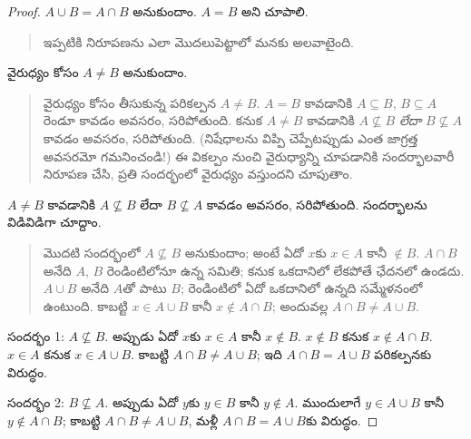 \documentclass[../../../include/open-logic-section]{subfiles}
\begin{document}
\begin{proof}
  $A \cup B = A \cap B$ అనుకుందాం. $A = B$ అని చూపాలి.
  \begin{quote}
    ఇప్పటికి నిరూపణను ఎలా మొదలుపెట్టాలో మనకు అలవాటైంది.
  \end{quote}
  వైరుధ్యం కోసం $A \neq B$ అనుకుందాం.
  \begin{quote}
    వైరుధ్యం కోసం తీసుకున్న పరికల్పన $A \neq
    B$. $A = B$ కావడానికి $A \subseteq B$, $B \subseteq A$ రెండూ కావడం అవసరం, సరిపోతుంది. కనుక $A \neq B$ కావడానికి $A \nsubseteq B$ \emph{లేదా} $B \nsubseteq
    A$ కావడం అవసరం, సరిపోతుంది. (నిషేధాలను విప్పి చెప్పేటప్పుడు ఎంత జాగ్రత్త అవసరమో గమనించండి!{}) ఈ వికల్పం నుంచి వైరుధ్యాన్ని చూపడానికి సందర్భాలవారీ నిరూపణ చేసి, ప్రతి సందర్భంలో వైరుధ్యం వస్తుందని చూపుతాం.
  \end{quote}
  $A \neq B$ కావడానికి $A \nsubseteq B$ లేదా $B \nsubseteq A$ కావడం అవసరం, సరిపోతుంది. సందర్భాలను విడివిడిగా చూద్దాం.
  \begin{quote}
    మొదటి సందర్భంలో $A \nsubseteq B$ అనుకుందాం; అంటే ఏదో $x$కు $x \in A$ కానీ $\notin B$. $A \cap B$ అనేది $A$, $B$ రెండింటిలోనూ ఉన్న  సమితి; కనుక ఒకదానిలో లేకపోతే ఛేదనలో ఉండదు. $A \cup B$ అనేది $A$తో పాటు $B$; రెండింటిలో ఏదో ఒకదానిలో ఉన్నది సమ్మేళనంలో ఉంటుంది. కాబట్టి $x \in A \cup B$ కానీ $x \notin A \cap
    B$; అందువల్ల $A \cap B \neq A \cup B$.
  \end{quote}
  
  సందర్భం 1: $A \nsubseteq B$. అప్పుడు ఏదో $x$కు $x \in A$ కానీ $x \notin
  B$. $x \notin B$ కనుక $x \notin A \cap B$. $x \in A$ కనుక $x \in A \cup B$. కాబట్టి $A \cap B \neq A \cup B$; ఇది $A \cap B = A \cup B$ పరికల్పనకు విరుద్ధం.

  సందర్భం 2: $B \nsubseteq A$. అప్పుడు ఏదో $y$కు $y \in B$ కానీ $y \notin
  A$. ముందులాగే $y \in A \cup B$ కానీ $y \notin A \cap B$; కాబట్టి $A \cap B \neq A \cup B$, మళ్లీ $A \cap B = A \cup
  B$కు విరుద్ధం.
\end{proof}
\end{document}
